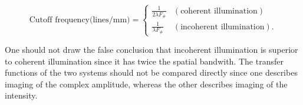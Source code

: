\documentclass{article}
\newcommand\crule[3][black]{\textcolor{#1}{\rule{#2}{#3}}}
\numberwithin{figure}{subsection}
\numberwithin{table}{subsection}
\begin{document}
\begin{equation}
\text{Cutoff frequency(lines/mm)} =
\begin{cases}
\frac{1}{2 \lambda F_\#} & (\text{coherent illumination}) \\
\frac{1}{\lambda F_\#} & (\text{incoherent illumination}) .
\end{cases}
\end{equation}
\par One should not draw the false conclusion that incoherent illumination is superior to coherent illumination since it has twice the spatial bandwith. The transfer functions of the two systems should not be compared directly since one describes imaging of the complex amplitude, whereas the other describes imaging of the intensity.\\
\noindent{\crule[ksc]{\textwidth}{0.1cm}}

\bigbreak\begingroup
\color{ksc}
\end{document}

